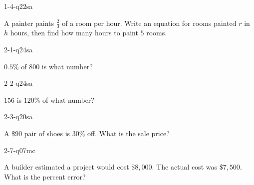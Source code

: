 
\begin{practiceQuestion}{1-4-q22}{sa}
\begin{questionText}
A painter paints $\frac{2}{3}$ of a room per hour. Write an equation for rooms painted $r$ in $h$ hours, then find how many hours to paint $5$ rooms.
\end{questionText}
\end{practiceQuestion}

\begin{practiceQuestion}{2-1-q24}{sa}
\begin{questionText}
$0.5\%$ of $800$ is what number?
\end{questionText}
\end{practiceQuestion}

\begin{practiceQuestion}{2-2-q24}{sa}
\begin{questionText}
$156$ is $120\%$ of what number?
\end{questionText}
\end{practiceQuestion}

\begin{practiceQuestion}{2-3-q20}{sa}
\begin{questionText}
A $\$90$ pair of shoes is $30\%$ off. What is the sale price?
\end{questionText}
\end{practiceQuestion}

\begin{practiceQuestion}{2-7-q07}{mc}
\begin{questionText}
A builder estimated a project would cost $\$8{,}000$. The actual cost was $\$7{,}500$. What is the percent error?
\end{questionText}
\end{practiceQuestion}

